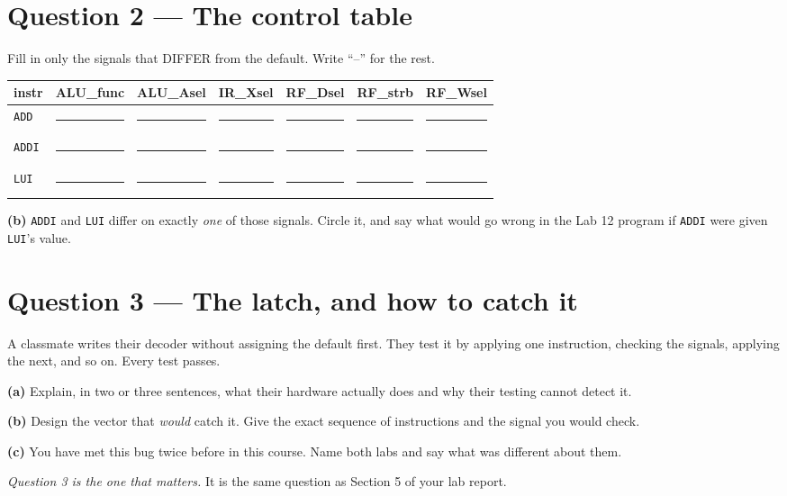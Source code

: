 \documentclass[11pt]{article}
\newcommand{\code}[1]{\texttt{#1}}
\newcommand{\answerbox}[1]{\vspace{2pt}\fbox{\parbox[c][#1][c]{\dimexpr\linewidth-2\fboxsep-2\fboxrule}{\ }}\vspace{4pt}}
\begin{document}
\answerbox{1.6cm}

\section*{Question 2 --- The control table}

Fill in only the signals that DIFFER from the default. Write ``--'' for the
rest.

\begin{center}
\small
\begin{tabular}{lllllll}
\toprule
instr & ALU\_func & ALU\_Asel & IR\_Xsel & RF\_Dsel & RF\_strb & RF\_Wsel \\
\midrule
\code{ADD}  & \rule{1.5cm}{0.4pt} & \rule{1.5cm}{0.4pt} & \rule{1.3cm}{0.4pt} & \rule{1.3cm}{0.4pt} & \rule{1.5cm}{0.4pt} & \rule{1.3cm}{0.4pt} \\[6pt]
\code{ADDI} & \rule{1.5cm}{0.4pt} & \rule{1.5cm}{0.4pt} & \rule{1.3cm}{0.4pt} & \rule{1.3cm}{0.4pt} & \rule{1.5cm}{0.4pt} & \rule{1.3cm}{0.4pt} \\[6pt]
\code{LUI}  & \rule{1.5cm}{0.4pt} & \rule{1.5cm}{0.4pt} & \rule{1.3cm}{0.4pt} & \rule{1.3cm}{0.4pt} & \rule{1.5cm}{0.4pt} & \rule{1.3cm}{0.4pt} \\
\bottomrule
\end{tabular}
\end{center}

\textbf{(b)} \code{ADDI} and \code{LUI} differ on exactly \emph{one} of those
signals. Circle it, and say what would go wrong in the Lab 12 program if
\code{ADDI} were given \code{LUI}'s value.

\answerbox{2.2cm}

\section*{Question 3 --- The latch, and how to catch it}

A classmate writes their decoder without assigning the default first. They test
it by applying one instruction, checking the signals, applying the next, and so
on. Every test passes.

\textbf{(a)} Explain, in two or three sentences, what their hardware actually
does and why their testing cannot detect it.

\answerbox{2.4cm}

\textbf{(b)} Design the vector that \emph{would} catch it. Give the exact
sequence of instructions and the signal you would check.

\answerbox{2.2cm}

\textbf{(c)} You have met this bug twice before in this course. Name both labs
and say what was different about them.

\answerbox{2.0cm}

\vfill
{\small\emph{Question 3 is the one that matters.} It is the same question as
Section 5 of your lab report.}
\end{document}
